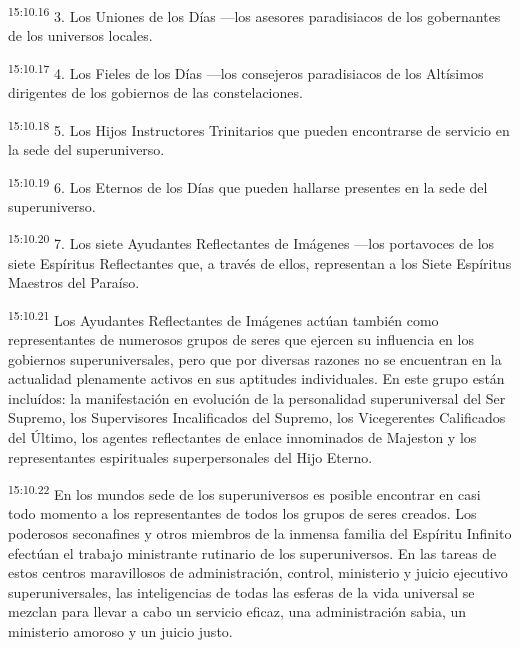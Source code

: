 \par
\textsuperscript{15:10.16} 3. Los Uniones de los Días ---los asesores paradisiacos de los gobernantes de los universos locales.

\par
\textsuperscript{15:10.17} 4. Los Fieles de los Días ---los consejeros paradisiacos de los Altísimos dirigentes de los gobiernos de las constelaciones.

\par
\textsuperscript{15:10.18} 5. Los Hijos Instructores Trinitarios que pueden encontrarse de servicio en la sede del superuniverso.

\par
\textsuperscript{15:10.19} 6. Los Eternos de los Días que pueden hallarse presentes en la sede del superuniverso.

\par
\textsuperscript{15:10.20} 7. Los siete Ayudantes Reflectantes de Imágenes ---los portavoces de los siete Espíritus Reflectantes que, a través de ellos, representan a los Siete Espíritus Maestros del Paraíso.

\par
\textsuperscript{15:10.21} Los Ayudantes Reflectantes de Imágenes actúan también como representantes de numerosos grupos de seres que ejercen su influencia en los gobiernos superuniversales, pero que por diversas razones no se encuentran en la actualidad plenamente activos en sus aptitudes individuales. En este grupo están incluídos: la manifestación en evolución de la personalidad superuniversal del Ser Supremo, los Supervisores Incalificados del Supremo, los Vicegerentes Calificados del Último, los agentes reflectantes de enlace innominados de Majeston y los representantes espirituales superpersonales del Hijo Eterno.

\par
\textsuperscript{15:10.22} En los mundos sede de los superuniversos es posible encontrar en casi todo momento a los representantes de todos los grupos de seres creados. Los poderosos seconafines y otros miembros de la inmensa familia del Espíritu Infinito efectúan el trabajo ministrante rutinario de los superuniversos. En las tareas de estos centros maravillosos de administración, control, ministerio y juicio ejecutivo superuniversales, las inteligencias de todas las esferas de la vida universal se mezclan para llevar a cabo un servicio eficaz, una administración sabia, un ministerio amoroso y un juicio justo.


